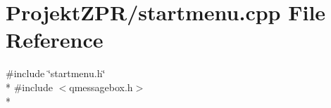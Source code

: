 \section{Projekt\-Z\-P\-R/startmenu.cpp File Reference}
\label{startmenu_8cpp}
{\ttfamily \#include \char`\"{}startmenu.\-h\char`\"{}}\\*
{\ttfamily \#include $<$qmessagebox.\-h$>$}\\*
